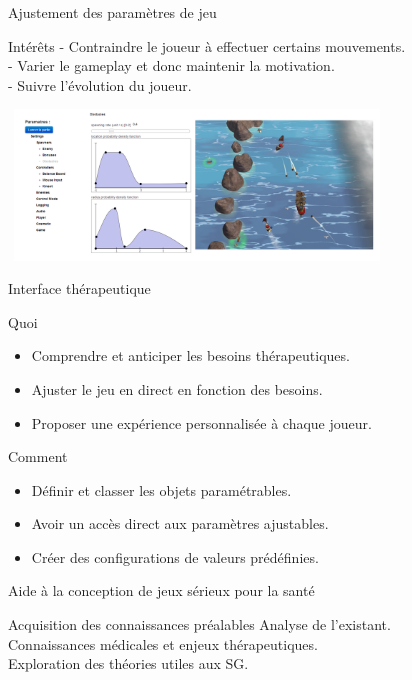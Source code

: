 \documentclass{beamer}
\begin{document}
		\begin{frame}{Ajustement des paramètres de jeu}
				\begin{block}{Intérêts}
					- Contraindre le joueur à effectuer certains mouvements.\\
					- Varier le gameplay et donc maintenir la motivation.\\
					- Suivre l'évolution du joueur.
				\end{block}
			\includegraphics[width=10cm, height=4cm]{../images/comparatif_interface_rochers.png}
		\end{frame}			
			
		\begin{frame}{Interface thérapeutique}
			\begin{block}{Quoi}
				\begin{itemize}
					\item<1-> Comprendre et anticiper les besoins thérapeutiques.
					\item<2-> Ajuster le jeu en direct en fonction des besoins.
					\item<3-> Proposer une expérience personnalisée à chaque joueur.
				\end{itemize}
			\end{block}
			\begin{block}{Comment}
				\begin{itemize}
					\item<1-> Définir et classer les objets paramétrables.
					\item<2-> Avoir un accès direct aux paramètres ajustables.			
					\item<3-> Créer des configurations de valeurs prédéfinies.
				\end{itemize}
			\end{block}		
		\end{frame}			
		
		\begin{frame}{Aide à la conception de jeux sérieux pour la santé}
			\begin{block}{Acquisition des connaissances préalables}
				Analyse de l'existant.\\
				Connaissances médicales et enjeux thérapeutiques.\\
				Exploration des théories utiles aux SG.				
			\end{block}
		\end{frame}
	
\end{document}
